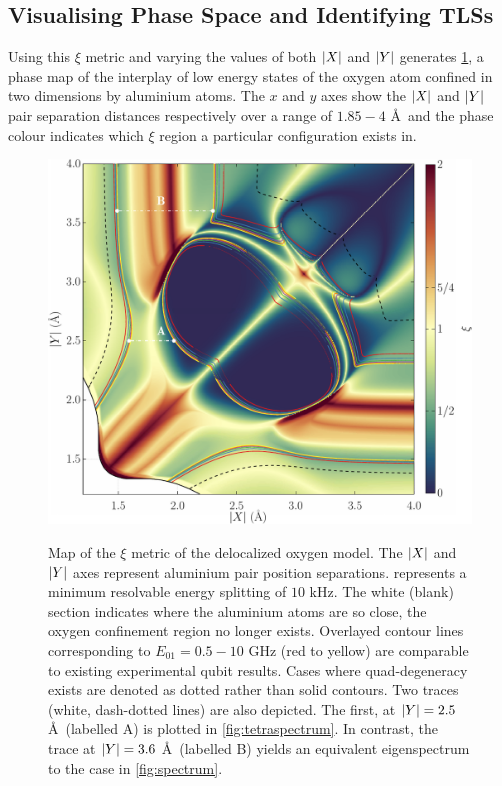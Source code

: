 \subsection{Visualising Phase Space and Identifying TLSs}\label{sec:phasespace}

Using this $\xi$ metric and varying the values of both $\lvert X\rvert$ and $\lvert Y\rvert$ generates \cref{fig:xiunbound}, a phase map of the interplay of low energy states of the oxygen atom confined in two dimensions by aluminium atoms.
The $x$ and $y$ axes show the $\lvert X\rvert$ and $\lvert Y\rvert$ pair separation distances respectively over a range of $1.85\!-\!4$ \AA\ and the phase colour indicates which $\xi$ region a particular configuration exists in.

\begin{figure}[htp]
\includegraphics[width=\textwidth]{figures/xiunbound}\\
\caption[$\xi$ Metric Phase Map, Unbound in $z$]{\label{fig:xiunbound}Map of the $\xi$ metric of the delocalized oxygen  model. The $\lvert X\rvert$ and $\lvert Y\rvert$ axes represent aluminium pair position separations.  represents a minimum resolvable energy splitting of $10$ kHz. The white (blank) section indicates where the aluminium atoms are so close, the oxygen confinement region no longer exists. Overlayed contour lines corresponding to $E_{01} = 0.5\!-\!10$ GHz (red to yellow) are comparable to existing experimental qubit results. Cases where quad-degeneracy exists are denoted as dotted rather than solid contours. Two traces (white, dash-dotted lines) are also depicted. The first, at $\lvert Y\rvert = 2.5$ \AA\ (labelled A) is plotted in \cref{fig:tetraspectrum}. In contrast, the trace at $\lvert Y\rvert = 3.6$ \AA\ (labelled B) yields an equivalent eigenspectrum to the  case in \cref{fig:spectrum}.}
\end{figure}

